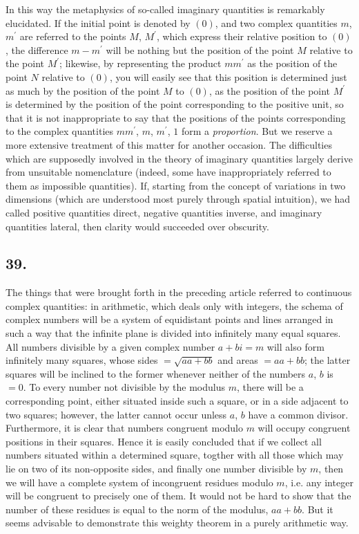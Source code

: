 \documentclass[twoside,12pt]{memoir}
\begin{document}
In this way the metaphysics of so-called imaginary quantities is remarkably elucidated. If the initial point is denoted by \((0)\), and two complex quantities \(m\), \(m^{\prime}\) are referred to the points \(M\), \(M^{\prime}\), which express their relative position to \((0)\), the difference \(m-m^{\prime}\) will be nothing but the position of the point \(M\) relative to the point \(M^{\prime}\); likewise, by representing the product \(m m^{\prime}\) as the position of the point \(N\) relative to \((0)\), you will easily see that this position is determined just as much by the position of the point \(M\) to \((0)\), as the position of the point \(M^{\prime}\) is determined by the position of the point corresponding to the positive unit, so that it is not inappropriate to say that the positions of the points corresponding to the complex quantities \(m m^{\prime}\), \pagebreak%
\(m\), \(m^{\prime}\), \(1\) form a \textit{proportion}. But we reserve a more extensive treatment of this matter for another occasion. The difficulties which are supposedly involved in the theory of imaginary quantities largely derive from unsuitable nomenclature (indeed, some have inappropriately referred to them as impossible quantities). If, starting from the concept of variations in two dimensions (which are understood most purely through spatial intuition), we had called positive quantities direct, negative quantities inverse, and imaginary quantities lateral, then clarity would succeeded over obscurity.

\subsection*{39.}

The things that were brought forth in the preceding article referred to continuous complex quantities: in arithmetic, which deals only with integers, the schema of complex numbers will be a system of equidistant points and lines arranged in such a way that the infinite plane is divided into infinitely many equal squares. All numbers divisible by a given complex number \(a+bi=m\) will also form infinitely many squares, whose sides \(=\sqrt{a a+b b}\) and areas \(=a a+b b\); the latter squares will be inclined to the former whenever neither of the numbers \(a\), \(b\) is \(=0\). To every number not divisible by the modulus \(m\), there will be a corresponding point, either situated inside such a square, or in a side adjacent to two squares; however, the latter cannot occur unless \(a\), \(b\) have a common divisor. Furthermore, it is clear that numbers congruent modulo \(m\) will occupy congruent positions in their squares. Hence it is easily concluded that if we collect all numbers situated within a determined square, togther with all those which may lie on two of its non-opposite sides, and finally one number divisible by \(m\), then we will have a complete system of incongruent residues modulo \(m\), i{.}e{.} any integer will be congruent to precisely one of them. It would not be hard to show that the number of these residues is equal to the norm of the modulus, \(a a+b b\). But it seems advisable to demonstrate this weighty theorem in a purely arithmetic way.
\end{document}
